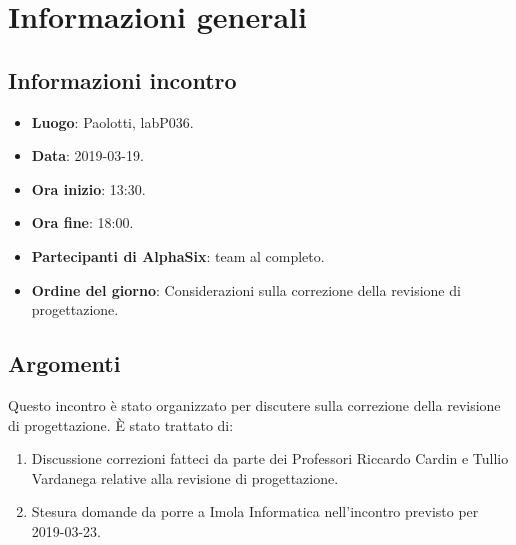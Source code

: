 \newcommand{\documento}{\VI}
\newcommand{\nomedocumentofisico}{VI\_2019-03-19.pdf}
\newcommand{\redazione}{\SG}
\newcommand{\verifica}{\CV}
\newcommand{\approvazione}{\NC}
\newcommand{\versione}{1.0.0}
\newcommand{\uso}{Interno}
\newcommand{\destinateTo}{\gruppo}
\newcommand{\datacreazione}{19 marzo 2019}
\newcommand{\datamodifica}{21 marzo 2019}
\newcommand{\stato}{Approvato}

\def\TABELLE{false}	%
\def\FIGURE{false} 	%






    

    

    \section{Informazioni generali}
		\subsection{Informazioni incontro}
			\begin{itemize}
				\item \textbf{Luogo}: Paolotti, labP036.
				\item \textbf{Data}: 2019-03-19.
				\item \textbf{Ora inizio}: 13:30.
				\item \textbf{Ora fine}: 18:00.
				\item \textbf{Partecipanti di AlphaSix}: team al completo.
				\item \textbf{Ordine del giorno}: Considerazioni sulla correzione della revisione di progettazione.
			\end{itemize}

        \subsection{Argomenti}
            Questo incontro è stato organizzato per discutere sulla correzione della revisione di progettazione. È stato trattato di:
            \begin{enumerate}
                \item Discussione correzioni fatteci da parte dei Professori Riccardo Cardin e Tullio Vardanega relative alla revisione di progettazione.
                \item Stesura domande da porre a Imola Informatica nell'incontro previsto per 2019-03-23.
            \end{enumerate}

